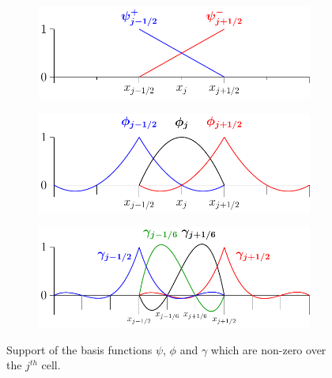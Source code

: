 \documentclass[times]{elsarticle}
\begin{document}
\begin{figure}
	\centering
		\begin{subfigure}{0.4\textwidth}
			\includegraphics[width=\textwidth]{./Figures/Diagrams/FEMbasis/P1/P1NN-figure0.pdf}
			\subcaption{$\psi$}
			\vspace{0.5cm}
		\end{subfigure}
		\begin{subfigure}{0.4\textwidth}
			\includegraphics[width=\textwidth]{./Figures/Diagrams/FEMbasis/P2/P2N-figure0.pdf}
			\subcaption{$\phi$}
			\vspace{0.5cm}
		\end{subfigure}
		\begin{subfigure}{0.5\textwidth}
			\includegraphics[width=\textwidth]{./Figures/Diagrams/FEMbasis/P3/P3-figure0.pdf}
			\subcaption{$\gamma$}
			\vspace{0.5cm}
		\end{subfigure}
	\caption{Support of the basis functions $\psi$, $\phi$ and $\gamma$ which are non-zero over the $j^{th}$ cell.}
	\label{fig:P1DiscBasis}
\end{figure}
\end{document}
